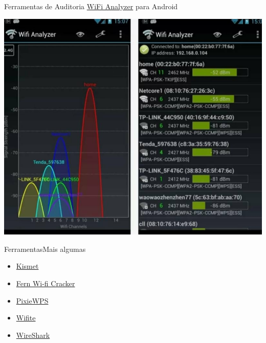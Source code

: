 \begin{frame}{Ferramentas de Auditoria}
\href{https://play.google.com/store/apps/details?id=com.farproc.wifi.analyzer&hl=pt_BR&gl=US}{WiFi Analyzer} 
para Android\bigskip

 \includegraphics[scale=.275]{img/wifi-analyzer.png}
\end{frame}

\begin{frame}{Ferramentas}{Mais algumas}

\begin{itemize}
\item \href{https://www.kismetwireless.net/}{Kismet}
\item \href{https://github.com/savio-code/fern-wifi-cracker}{Fern Wi-fi Cracker}
\item \href{https://github.com/wiire-a/pixiewps}{PixieWPS}
\item \href{https://github.com/derv82/wifite2}{Wifite}
\item \href{https://www.wireshark.org/}{WireShark}
\end{itemize}

\end{frame}